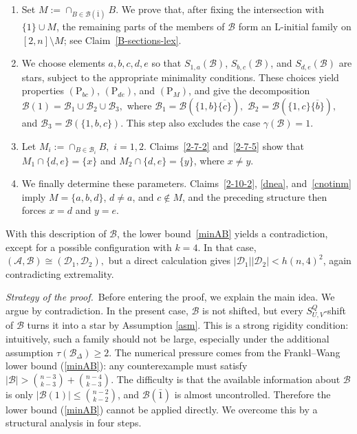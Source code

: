 \documentclass[a4paper,11pt]{article}
\begin{document}
\begin{enumerate}[(1)]
\item Set $M:=\cap_{B\in\mathcal B(\bar1)}B.$ 
We prove that, after fixing the intersection with $\{1\}\cup M$, the
remaining parts of the members of $\mathcal B$ form an L-initial family
on $[2,n]\setminus M$; see Claim~\ref{B-sections-lex}.

\item We choose elements $a,b,c,d,e$ so that
$S_{1,a}(\mathcal B)$, $S_{b,c}(\mathcal B)$, and
$S_{d,e}(\mathcal B)$ are stars, subject to the appropriate minimality
conditions. These choices yield properties
$(\mathrm P_{bc})$, $(\mathrm P_{de})$, and $(\mathrm P_M)$, and give
the decomposition $\mathcal B(1)=\mathcal B_1\mathbin{\cup}
\mathcal B_2\mathbin{\cup}\mathcal B_3,$
where $\mathcal B_1=\mathcal B(\{1,b\}\overline{\{c\}}),$ $\mathcal B_2=\mathcal B(\{1,c\}\overline{\{b\}}),$ and $\mathcal B_3=\mathcal B(\{1,b,c\}).$
This step also excludes the case $\gamma(\mathcal B)=1$.

\item Let $M_i:=\cap_{B\in\mathcal B_i}B,$ $i=1,2.$
Claims~\ref{2-7-2} and~\ref{2-7-5} show that $M_1\cap\{d,e\}=\{x\}$ and $M_2\cap\{d,e\}=\{y\}$, where $x\ne y$.

\item We finally determine these parameters. Claims~\ref{2-10-2},
\ref{dnea}, and~\ref{cnotinm} imply $M=\{a,b,d\}$, $d\ne a$, and $c\notin M$, 
and the preceding structure then forces $x=d$ and $y=e$.
\end{enumerate}

With this description of $\mathcal B$, the lower
bound~\eqref{minAB} yields a contradiction, except for a possible
configuration with $k=4$. In that case, $(\mathcal A,\mathcal B)\cong(\mathcal D_1,\mathcal D_2),$
but a direct calculation gives
$|\mathcal D_1||\mathcal D_2|<h(n,4)^2$, again contradicting
extremality.


\iffalse
\medskip
\noindent\textit{Strategy of the proof.}\,
Before entering the proof, we explain the main idea. We argue by
contradiction. In the present case, $\mathcal B$ is not shifted, but every $S_{U,V}^Q$-shift of $\mathcal B$ turns it into a star by Assumption \ref{asm}. This is a strong rigidity condition: intuitively, such
a family should not be large, especially under the additional assumption $\tau(\mathcal B_\Delta)\ge2.$
The numerical pressure comes from the Frankl--Wang lower bound (\ref{minAB}): any counterexample must satisfy $|\mathcal B|>{n-3\choose k-3}+{n-4\choose k-3}.$ 
The difficulty is that the available information about $\mathcal B$ is only $|\mathcal B(1)|\le {n-2\choose k-2}$, and $\mathcal B(\bar1)$ is almost uncontrolled. Therefore the lower bound (\ref{minAB}) cannot be applied directly. 
We overcome this by a structural analysis in four steps.
\end{document}
